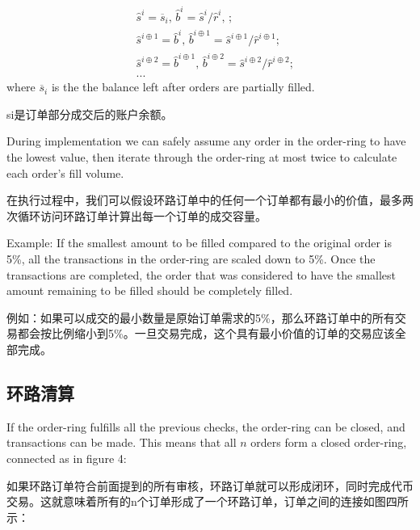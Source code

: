 \documentclass[UTF8,nofonts]{ctexart}
\makeatletter
\newenvironment{figurehere}
 {\def\@captype{figure}}
 {}
\makeatother
\begin{document}
\begin{multicols}{2}
\[
\begin{split}
&\hat{s}^{i}=\overline{s}_i\text{, } \hat{b}^{i}=\hat{s}^{i}/ \hat{r}^i\text{, }\text{;}\\
&\hat{s}^{i\oplus 1}=\hat{b}^i\text{, } \hat{b}^{i\oplus 1}=\hat{s}^{i\oplus 1}/ \hat{r}^{i\oplus 1}\text{;}\\
&\hat{s}^{i\oplus 2}=\hat{b}^{i\oplus 1}\text{, } \hat{b}^{i\oplus 2}=\hat{s}^{i\oplus 2}/ \hat{r}^{i\oplus 2}\text{;}\\
& ...
\end{split}
\]
where $\overline{s}_i$ is the the balance left after orders are partially filled.

si是订单部分成交后的账户余额。


During implementation we can safely assume any order in the order-ring to have the lowest value, then iterate through the order-ring at most twice to calculate each order's fill volume. 

在执行过程中，我们可以假设环路订单中的任何一个订单都有最小的价值，最多两次循环访问环路订单计算出每一个订单的成交容量。


Example: If the smallest amount to be filled compared to the original order is 5\%, all the transactions in the order-ring are scaled down to 5\%. Once the transactions are completed, the order that was considered to have the smallest amount remaining to be filled should be completely filled.

例如：如果可以成交的最小数量是原始订单需求的5\%，那么环路订单中的所有交易都会按比例缩小到5\%。一旦交易完成，这个具有最小价值的订单的交易应该全部完成。


\subsection{环路清算\label{sec:settlement}}

If the order-ring fulfills all the previous checks, the order-ring can be closed, and transactions can be made. This means that all $n$ orders form a closed order-ring, connected as in figure 4:

如果环路订单符合前面提到的所有审核，环路订单就可以形成闭环，同时完成代币交易。这就意味着所有的n个订单形成了一个环路订单，订单之间的连接如图四所示：

\begin{center}
\begin{figurehere}
\centering
\begin{tikzpicture}[
circle/.style={
		scale=0.75,
		rounded corners,
		draw=black, 
		text centered,
		}
]


\end{tikzpicture}
\end{figurehere}
\end{center}
\end{multicols}
\end{document}
